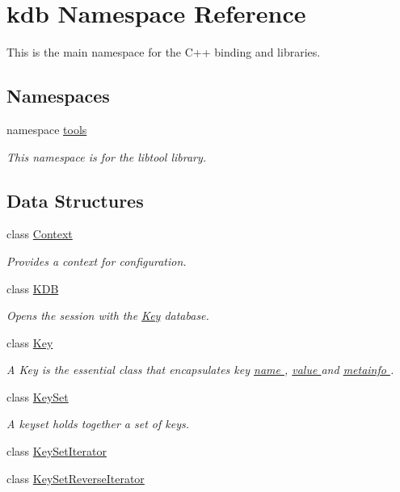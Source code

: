 \hypertarget{namespacekdb}{\section{kdb Namespace Reference}
\label{namespacekdb}
}


This is the main namespace for the C++ binding and libraries.  


\subsection*{Namespaces}
\begin{DoxyCompactItemize}
\item 
namespace \hyperlink{namespacekdb_1_1tools}{tools}
\begin{DoxyCompactList}\small\item\em This namespace is for the libtool library. \end{DoxyCompactList}\end{DoxyCompactItemize}
\subsection*{Data Structures}
\begin{DoxyCompactItemize}
\item 
class \hyperlink{classkdb_1_1Context}{Context}
\begin{DoxyCompactList}\small\item\em Provides a context for configuration. \end{DoxyCompactList}\item 
class \hyperlink{classkdb_1_1KDB}{K\-D\-B}
\begin{DoxyCompactList}\small\item\em Opens the session with the \hyperlink{classkdb_1_1Key}{Key} database.   \end{DoxyCompactList}\item 
class \hyperlink{classkdb_1_1Key}{Key}
\begin{DoxyCompactList}\small\item\em A Key is the essential class that encapsulates key \hyperlink{group__keyname}{name }, \hyperlink{group__keyvalue}{value } and \hyperlink{group__keymeta}{metainfo }.  \end{DoxyCompactList}\item 
class \hyperlink{classkdb_1_1KeySet}{Key\-Set}
\begin{DoxyCompactList}\small\item\em A keyset holds together a set of keys. \end{DoxyCompactList}\item 
class \hyperlink{classkdb_1_1KeySetIterator}{Key\-Set\-Iterator}
\item 
class \hyperlink{classkdb_1_1KeySetReverseIterator}{Key\-Set\-Reverse\-Iterator}
\end{DoxyCompactItemize}
